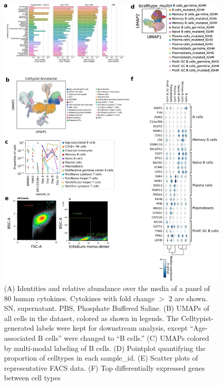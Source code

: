 \begin{figure}[hbt!]
\centering
\includegraphics[width=14cm, keepaspectratio]{figs/paper2/figs1_bcd.jpg}
\caption[Analysis of stimulation cocktail and presentation of pre-processing steps.]{(A) Identities and relative abundance over the media of a panel of 80 human cytokines. Cytokines with fold change $>$ 2 are shown. SN, supernatant. PBS, Phosphate Buffered Saline. (B) UMAPs of all cells in the dataset, colored as shown in legends. The Celltypist-generated labels were kept for downstream analysis, except “Age-associated B cells” were changed to “B cells.” (C) UMAPs colored by multi-modal labeling of B cells. (D) Pointplot quantifying the proportion of celltypes in each sample\_id. (E) Scatter plots of representative FACS data. (F) Top differentially expressed genes between cell types}
\label{fig:paper2_fig_s1}
\end{figure}


